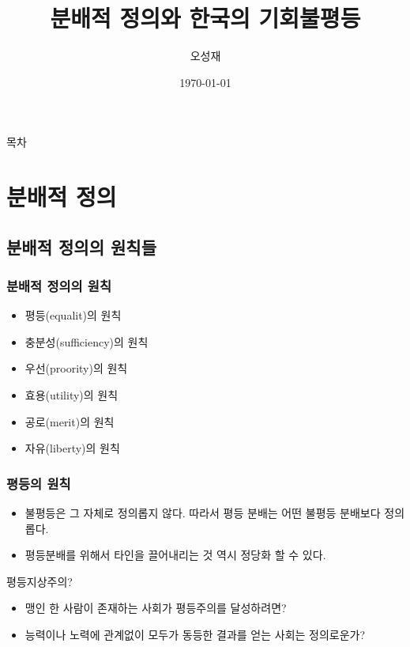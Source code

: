 \documentclass[aspectratio=169,xcolor=dvipsnames,handout]{beamer}
\title{분배적 정의와 한국의 기회불평등}
\subtitle{}
\author{오성재}
\institute[CNU]
    {\relax
        사회보장정책연구실 세미나
    }
\date{\today}
\begin{document}

\frame{\titlepage}

\begin{frame}{목차}
    \setcounter{tocdepth}{1}
    \tableofcontents
\end{frame}

\section{분배적 정의}
\subsection{분배적 정의의 원칙들}
\begin{frame}[<+->]
\frametitle{분배적 정의의 원칙}
    \begin{itemize}
        \item 평등(equalit)의 원칙
        \item 충분성(sufficiency)의 원칙
        \item 우선(proority)의 원칙
        \item 효용(utility)의 원칙
        \item 공로(merit)의 원칙
        \item 자유(liberty)의 원칙
    \end{itemize}
\end{frame}

\begin{frame}[<+->]
\frametitle{평등의 원칙}
    \begin{itemize}
        \item 불평등은 그 자체로 정의롭지 않다. 따라서 평등 분배는 어떤 불평등 분배보다 정의롭다.
        \item 평등분배를 위해서 타인을 끌어내리는 것 역시 정당화 할 수 있다.
    \end{itemize}
    \begin{alertblock}{평등지상주의?}
    \begin{itemize}
        \item 맹인 한 사람이 존재하는 사회가 평등주의를 달성하려면?
        \item 능력이나 노력에 관계없이 모두가 동등한 결과를 얻는 사회는 정의로운가?
    \end{itemize}
    \end{alertblock}
\end{frame}
\end{document}
